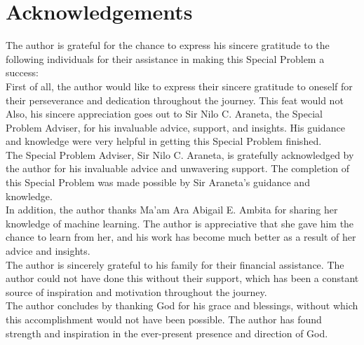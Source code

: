 \chapter{Acknowledgements}
\label{sec:appendix_e}
The author is grateful for the chance to express his sincere gratitude to the following 
individuals for their assistance in making this Special Problem a success:
\\

First of all, the author would like to express their sincere gratitude to oneself 
for their perseverance and dedication throughout the journey. This feat would not
\\

Also, his sincere appreciation goes out to Sir Nilo C. Araneta, 
the Special Problem Adviser, for his invaluable advice, support, and insights. 
His guidance and knowledge were very helpful in getting this Special Problem finished.
\\

The Special Problem Adviser, Sir Nilo C. Araneta, is gratefully acknowledged by the author 
for his invaluable advice and unwavering support. The completion of this Special Problem was made 
possible by Sir Araneta's guidance and knowledge.
\\

In addition, the author thanks Ma'am Ara Abigail E. Ambita for 
sharing her knowledge of machine learning. The author is appreciative that she gave 
him the chance to learn from her, and his work has become much better as a result of her 
advice and insights.
\\

The author is sincerely grateful to his family for their financial assistance. 
The author could not have done this without their support, which has been a constant 
source of inspiration and motivation throughout the journey.
\\

The author concludes by thanking God for his grace and blessings, without which this 
accomplishment would not have been possible. The author has found strength and inspiration 
in the ever-present presence and direction of God.
\\